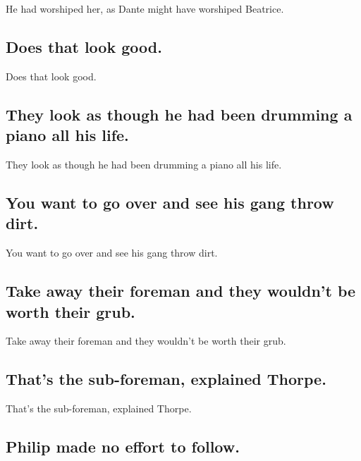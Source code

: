 \documentclass[]{article}
\begin{document}
He had worshiped her, as Dante might have worshiped Beatrice.

\hypertarget{does-that-look-good.}{%
\subsection{Does that look good.}\label{does-that-look-good.}}

Does that look good.

\hypertarget{they-look-as-though-he-had-been-drumming-a-piano-all-his-life.}{%
\subsection{They look as though he had been drumming a piano all his
life.}\label{they-look-as-though-he-had-been-drumming-a-piano-all-his-life.}}

They look as though he had been drumming a piano all his life.

\hypertarget{you-want-to-go-over-and-see-his-gang-throw-dirt.}{%
\subsection{You want to go over and see his gang throw
dirt.}\label{you-want-to-go-over-and-see-his-gang-throw-dirt.}}

You want to go over and see his gang throw dirt.

\hypertarget{take-away-their-foreman-and-they-wouldnt-be-worth-their-grub.}{%
\subsection{Take away their foreman and they wouldn't be worth their
grub.}\label{take-away-their-foreman-and-they-wouldnt-be-worth-their-grub.}}

Take away their foreman and they wouldn't be worth their grub.

\hypertarget{thats-the-sub-foreman-explained-thorpe.}{%
\subsection{That's the sub-foreman, explained
Thorpe.}\label{thats-the-sub-foreman-explained-thorpe.}}

That's the sub-foreman, explained Thorpe.

\hypertarget{philip-made-no-effort-to-follow.}{%
\subsection{Philip made no effort to
follow.}\label{philip-made-no-effort-to-follow.}}
\end{document}
